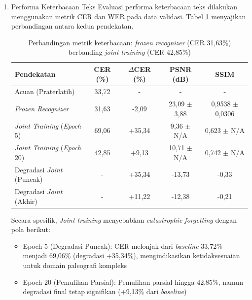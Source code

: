 \begin{enumerate}[leftmargin=1.5em, labelsep=0.5em, itemindent=0pt, noitemsep, topsep=0pt, label=\arabic*., leftmargin=0.8cm]
    \item Performa Keterbacaan Teks
          Evaluasi performa keterbacaan teks dilakukan menggunakan metrik CER dan WER pada data validasi. Tabel \ref{tab:frozen-vs-joint-cer} menyajikan perbandingan antara kedua pendekatan.
          \begin{table}[!htbp]
              \small
              \caption[Metrik keterbacaan frozen berbanding joint]{Perbandingan metrik keterbacaan: \textit{frozen recognizer} (CER 31,63\%) berbanding \textit{joint training} (CER 42,85\%)}
              \label{tab:frozen-vs-joint-cer}
              \begin{tabularx}{\textwidth}{|>{\raggedright\arraybackslash}X|c|c|c|c|}
                  \toprule
                  \textbf{Pendekatan}                & \textbf{CER (\%)} & \textbf{$\Delta$CER (\%)} & \textbf{PSNR (dB)}        & \textbf{SSIM}                \\
                  \midrule
                  Acuan (Praterlatih)    & 33,72    & -                & -                & -                   \\
                  \textit{Frozen Recognizer}         & 31,63    & -2,09            & 23,09 $\pm$ 3,88 & 0,9538 $\pm$ 0,0306 \\
                  \textit{Joint Training} (\textit{Epoch} 5)  & 69,06    & +35,34           & 9,36 $\pm$ N/A   & 0,623 $\pm$ N/A     \\
                  \textit{Joint Training} (\textit{Epoch} 20) & 42,85    & +9,13            & 10,71 $\pm$ N/A  & 0,742 $\pm$ N/A     \\
                  \midrule
                  Degradasi \textit{Joint} (Puncak)    & -        & +35,34           & -13,73           & -0,33               \\
                  Degradasi \textit{Joint} (Akhir)   & -        & +11,22           & -12,38           & -0,21               \\
                  \bottomrule
              \end{tabularx}
          \end{table}

          Secara spesifik, \textit{Joint training} menyebabkan \textit{catastrophic forgetting} dengan pola berikut:
          \begin{itemize}[nosep]
              \item Epoch 5 (Degradasi Puncak): CER melonjak dari \textit{baseline} 33,72\% menjadi 69,06\% (degradasi +35,34\%), mengindikasikan ketidaksesuaian untuk domain paleografi kompleks
              \item Epoch 20 (Pemulihan Parsial): Pemulihan parsial hingga 42,85\%, namun degradasi final tetap signifikan (+9,13\% dari \textit{baseline})
          \end{itemize}


\end{enumerate}
